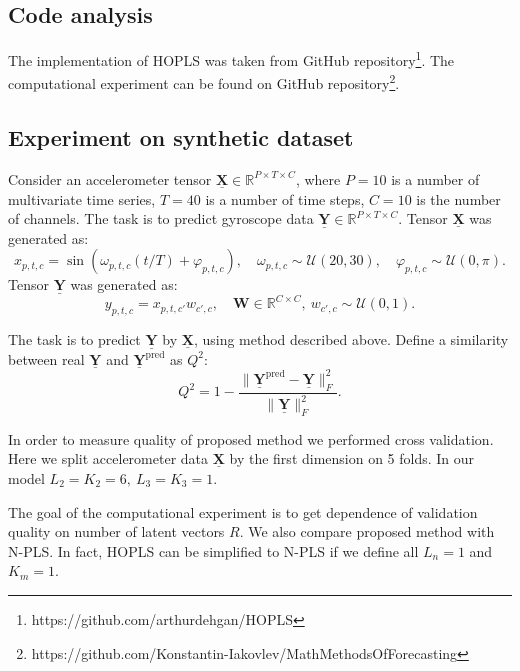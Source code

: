 \documentclass[../../main.tex]{subfiles}
\begin{document}
\subsection{Code analysis}

The implementation of HOPLS was taken from GitHub repository\footnote{https://github.com/arthurdehgan/HOPLS}. The computational experiment can be found on GitHub repository\footnote{https://github.com/Konstantin-Iakovlev/MathMethodsOfForecasting}.

\subsection{Experiment on synthetic dataset}

Consider an accelerometer tensor $\underline{\mathbf{X}}\in \mathbb{R}^{P\times T \times C}$, where $P = 10$ is a number of multivariate time series, $T = 40$ is a number of time steps, $C = 10$ is the number of channels. The task is to predict gyroscope data $\underline{\mathbf{Y}} \in \mathbb{R}^{P\times T \times C}$. Tensor $\underline{\mathbf{X}}$ was generated as:
\begin{equation}
x_{p, t, c} = \sin(\omega_{p, t, c} (t / T) + \varphi_{p,t, c}), \quad \omega_{p, t, c} \sim \mathcal{U}(20, 30), \quad \varphi_{p, t, c} \sim \mathcal{U}(0, \pi).
\end{equation}
Tensor $\underline{\mathbf{Y}}$ was generated as:
\begin{equation}
y_{p,t,c} = x_{p,t,c'}w_{c', c}, \quad\mathbf{W} \in \mathbb{R}^{C\times C}, ~w_{c', c}\sim \mathcal{U}(0, 1).
\end{equation}


The task is to predict $\underline{\mathbf{Y}}$ by $\underline{\mathbf{X}}$, using method described above. Define a similarity between real $\underline{\mathbf{Y}}$ and $\underline{\mathbf{Y}}^\text{pred}$ as $Q^2$:
\begin{equation}
Q^2 = 1 - \frac{\|\underline{\mathbf{Y}}^\text{pred} - \underline{\mathbf{Y}}\|_F^2}{\|\underline{\mathbf{Y}}\|_F^2}.
\end{equation}

In order to measure quality of proposed method we performed cross validation. Here we split accelerometer data $\underline{\mathbf{X}}$ by the first dimension on 5 folds. In our model $L_2 = K_2 = 6, ~L_3 = K_3 =1$.

The goal of the computational experiment is to get dependence of validation quality on number of latent vectors $R$. We also compare proposed method with N-PLS. In fact, HOPLS can be simplified to N-PLS if we define all $L_n = 1$ and $K_m = 1$. 
\end{document}

